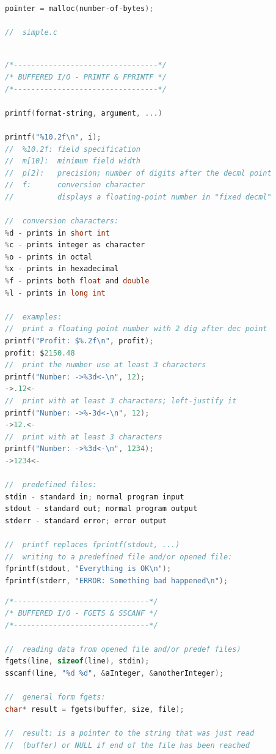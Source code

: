\documentclass[8pt]{extarticle}
\begin{document}
\begin{small}
\begin{multicols}{2}
\begin{lstlisting}[language=C]
pointer = malloc(number-of-bytes);

//  simple.c



\end{lstlisting}

\begin{lstlisting}[language=C]
/*---------------------------------*/
/* BUFFERED I/O - PRINTF & FPRINTF */
/*---------------------------------*/

printf(format-string, argument, ...)

printf("%10.2f\n", i);
//  %10.2f: field specification
//  m[10]: 	minimum field width
//  p[2]: 	precision; number of digits after the decml point
//  f: 		conversion character
//	   		displays a floating-point number in "fixed decml"

//  conversion characters:
%d - prints in short int
%c - prints integer as character
%o - prints in octal
%x - prints in hexadecimal
%f - prints both float and double
%l - prints in long int

//  examples:
//  print a floating point number with 2 dig after dec point
printf("Profit: $%.2f\n", profit);
profit: $2150.48
//  print the number use at least 3 characters
printf("Number: ->%3d<-\n", 12);
->.12<-
//  print with at least 3 characters; left-justify it
printf("Number: ->%-3d<-\n", 12);
->12.<-
//  print with at least 3 characters
printf("Number: ->%3d<-\n", 1234);
->1234<-

//  predefined files:
stdin - standard in; normal program input
stdout - standard out; normal program output
stderr - standard error; error output

//  printf replaces fprintf(stdout, ...)
//  writing to a predefined file and/or opened file:
fprintf(stdout, "Everything is OK\n");
fprintf(stderr, "ERROR: Something bad happened\n");
\end{lstlisting}

\begin{lstlisting}[language=C]
/*-------------------------------*/
/* BUFFERED I/O - FGETS & SSCANF */
/*-------------------------------*/

//  reading data from opened file and/or predef files)
fgets(line, sizeof(line), stdin);
sscanf(line, "%d %d", &aInteger, &anotherInteger);

//  general form fgets:
char* result = fgets(buffer, size, file);

//  result: is a pointer to the string that was just read 
//  (buffer) or NULL if end of the file has been reached


\end{lstlisting}
\end{multicols}
\end{small}
\end{document}
